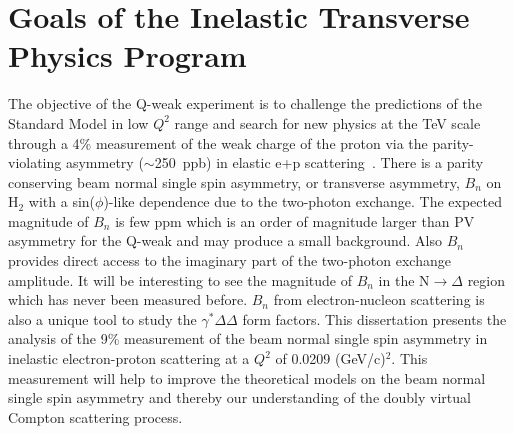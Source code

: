 %


\section{Goals of the Inelastic Transverse Physics Program}

The objective of the Q-weak experiment is to challenge the predictions of the Standard Model in low $Q^{2}$ range and search for new physics at the TeV scale through a 4\% measurement of the weak charge of the proton via the parity-violating asymmetry ($\sim$250~ppb) in elastic e+p scattering~\cite{qweak_proposal_2007}. There is a parity conserving beam normal single spin asymmetry, or transverse asymmetry, $B_{n}$ on H$_{2}$ with a sin($\phi$)-like dependence due to the two-photon exchange. The expected magnitude of $B_{n}$ is few ppm which is an order of magnitude larger than PV asymmetry for the Q-weak and may produce a small background. 
Also $B_{n}$ provides direct access to the imaginary part of the two-photon exchange amplitude. It will be interesting to see the magnitude of $B_{n}$ in the N$\rightarrow\Delta$ region which has never been measured before. 
$B_{n}$ from electron-nucleon scattering is also a unique tool to study the $\gamma^{*}\Delta\Delta$ form factors. 
This dissertation presents the analysis of the 9\% measurement of the beam normal single spin asymmetry in inelastic electron-proton scattering at a $Q^{2}$ of 0.0209 (GeV/c)$^{2}$. This measurement will help to improve the theoretical models on the beam normal single spin asymmetry and thereby our understanding of the doubly virtual Compton scattering process.


